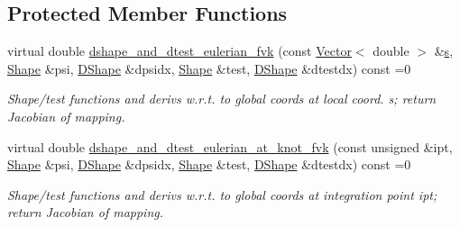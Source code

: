 \subsection*{Protected Member Functions}
\begin{DoxyCompactItemize}
\item 
virtual double \hyperlink{classoomph_1_1DisplacementBasedFoepplvonKarmanEquations_a91d0e65a45461295c271b6f2e9604f67}{dshape\+\_\+and\+\_\+dtest\+\_\+eulerian\+\_\+fvk} (const \hyperlink{classoomph_1_1Vector}{Vector}$<$ double $>$ \&\hyperlink{cfortran_8h_ab7123126e4885ef647dd9c6e3807a21c}{s}, \hyperlink{classoomph_1_1Shape}{Shape} \&psi, \hyperlink{classoomph_1_1DShape}{D\+Shape} \&dpsidx, \hyperlink{classoomph_1_1Shape}{Shape} \&test, \hyperlink{classoomph_1_1DShape}{D\+Shape} \&dtestdx) const =0
\begin{DoxyCompactList}\small\item\em Shape/test functions and derivs w.\+r.\+t. to global coords at local coord. s; return Jacobian of mapping. \end{DoxyCompactList}\item 
virtual double \hyperlink{classoomph_1_1DisplacementBasedFoepplvonKarmanEquations_a93b089c7109311817e2fbd7dfcdca1f2}{dshape\+\_\+and\+\_\+dtest\+\_\+eulerian\+\_\+at\+\_\+knot\+\_\+fvk} (const unsigned \&ipt, \hyperlink{classoomph_1_1Shape}{Shape} \&psi, \hyperlink{classoomph_1_1DShape}{D\+Shape} \&dpsidx, \hyperlink{classoomph_1_1Shape}{Shape} \&test, \hyperlink{classoomph_1_1DShape}{D\+Shape} \&dtestdx) const =0
\begin{DoxyCompactList}\small\item\em Shape/test functions and derivs w.\+r.\+t. to global coords at integration point ipt; return Jacobian of mapping. \end{DoxyCompactList}\end{DoxyCompactItemize}
